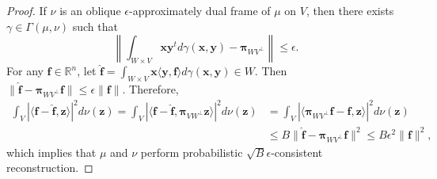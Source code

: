 \documentclass{amsart}
\numberwithin{equation}{section}
\newcommand{\bpi}{{\boldsymbol{\pi}}}
\theoremstyle{plain}
\theoremstyle{remark}
\theoremstyle{definition}
\begin{document}
\begin{proof}
If $\nu$ is an oblique $\epsilon$-approximately dual frame of $\mu$ on $V$, then there exists $\gamma \in \Gamma(\mu, \nu)$ such that 
 \begin{equation*}
      \left \| \int_{W \times V} \mathbf{x} \mathbf{y}^t d\gamma(\mathbf{x}, \mathbf{y}) - \bpi_{WV^\perp} \right \| \leq \epsilon.
    \end{equation*}
For any $\mathbf{f} \in \mathbb{R}^n$, let $\hat{\mathbf{f}} = \int_{W \times V} \mathbf{x} \langle \mathbf{y, f} \rangle d\gamma(\mathbf{x}, \mathbf{y}) \in W$.
Then  $\|\hat{\mathbf{f}} - \bpi_{WV^\perp} \mathbf{f}\| \leq \epsilon \|\mathbf{f}\|$. Therefore, 
    \begin{equation*}
    \begin{split}
        \int_{V} |\langle \mathbf{f} - \hat{\mathbf{f}}, \mathbf{z} \rangle|^2 d\nu(\mathbf{z}) 
        =  \int_{V} |\langle \mathbf{f} - \hat{\mathbf{f}}, \bpi_{VW^\perp}\mathbf{z} \rangle|^2 d\nu(\mathbf{z}) 
       & = \int_{V} |\langle \bpi_{WV^\perp} \mathbf{f} - \hat{\mathbf{f}}, \mathbf{z} \rangle|^2 d\nu(\mathbf{z}) \\
        & \leq B \|\hat{\mathbf{f}} - \bpi_{WV^\perp} \mathbf{f}\|^2 \leq B \epsilon^2 \|\mathbf{f}\|^2,
    \end{split}
    \end{equation*}
which implies that $\mu$ and $\nu$ perform probabilistic $\sqrt{B}\epsilon$-consistent reconstruction. 


\end{proof}
\end{document}
